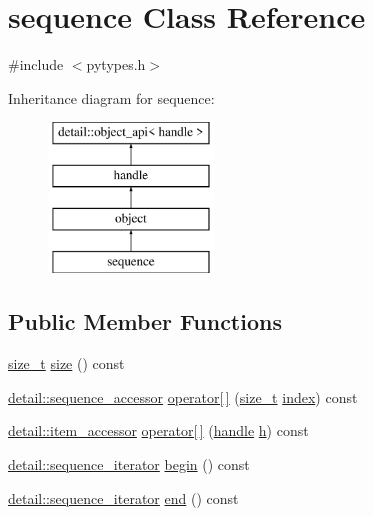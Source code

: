 \hypertarget{classsequence}{}\section{sequence Class Reference}
\label{classsequence}


{\ttfamily \#include $<$pytypes.\+h$>$}

Inheritance diagram for sequence\+:\begin{figure}[H]
\begin{center}
\leavevmode
\includegraphics[height=4.000000cm]{classsequence}
\end{center}
\end{figure}
\subsection*{Public Member Functions}
\begin{DoxyCompactItemize}
\item 
\mbox{\hyperlink{detail_2common_8h_a801d6a451a01953ef8cbae6feb6a3638}{size\+\_\+t}} \mbox{\hyperlink{classsequence_af35c852590d4618481b22030d82de2ff}{size}} () const
\item 
\mbox{\hyperlink{pytypes_8h_afb835b9074801782e0f25a6d78d1d450}{detail\+::sequence\+\_\+accessor}} \mbox{\hyperlink{classsequence_a81ac692e1c3c30d1b1e20a2adb74e584}{operator\mbox{[}$\,$\mbox{]}}} (\mbox{\hyperlink{detail_2common_8h_a801d6a451a01953ef8cbae6feb6a3638}{size\+\_\+t}} \mbox{\hyperlink{_s_d_l__opengl__glext_8h_a57f14e05b1900f16a2da82ade47d0c6d}{index}}) const
\item 
\mbox{\hyperlink{pytypes_8h_a9907d3edf962653e33d36bccc8b8a268}{detail\+::item\+\_\+accessor}} \mbox{\hyperlink{classsequence_a2c7987585276aebba74a9463f6a458e0}{operator\mbox{[}$\,$\mbox{]}}} (\mbox{\hyperlink{classhandle}{handle}} \mbox{\hyperlink{_s_d_l__opengl__glext_8h_afa0fb1b5e976920c0abeff2dca3ed774}{h}}) const
\item 
\mbox{\hyperlink{pytypes_8h_ab0cb36845bb4ad0fcdbc49fbc78bc765}{detail\+::sequence\+\_\+iterator}} \mbox{\hyperlink{classsequence_a6ee816a2ebf7527e19fa141d685c701b}{begin}} () const
\item 
\mbox{\hyperlink{pytypes_8h_ab0cb36845bb4ad0fcdbc49fbc78bc765}{detail\+::sequence\+\_\+iterator}} \mbox{\hyperlink{classsequence_ab2111257eac7ea5438d4ba0bc74914a8}{end}} () const
\end{DoxyCompactItemize}
